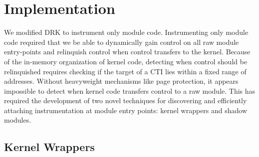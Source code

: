 \documentclass[10pt,preprint]{sigplanconf}
\begin{document}

\section{Implementation}

We modified DRK \cite{Feiner2012} to instrument only module code. Instrumenting only module code required that we be able to dynamically gain control on all raw module entry-points and relinquish control when control transfers to the kernel. Because of the in-memory organization of kernel code, detecting when control should be relinquished requires checking if the target of a CTI lies within a fixed range of addresses. Without heavyweight mechanisms like page protection, it appears impossible to detect when kernel code transfers control to a raw module. This has required the development of two novel techniques for discovering and efficiently attaching instrumentation at module entry points: kernel wrappers and shadow modules.


\subsection{Kernel Wrappers \label{sec:kernel_wrappers}}
\end{document}
